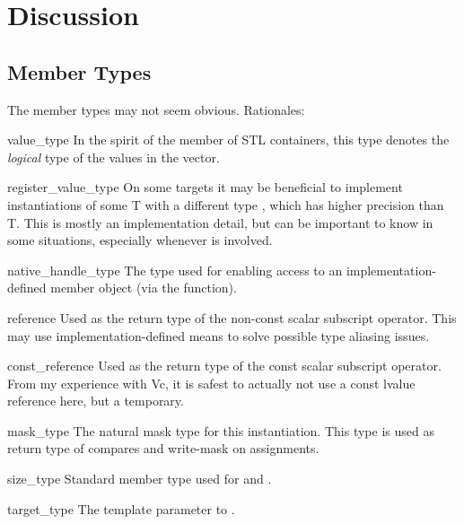\section{Discussion}

\subsection{Member Types}
The member types may not seem obvious.
Rationales:
\begin{typelist*}
  \item[value_type]
    In the spirit of the  member of STL containers, this type denotes the \emph{logical} type of the values in the vector.

  \item[register_value_type]
    On some targets it may be beneficial to implement \datapar instantiations of some \type T with a different type , which has higher precision than \type T.
    This is mostly an implementation detail, but can be important to know in some situations, especially whenever  is involved.


  \item[native_handle_type]
    The type used for enabling access to an implementation-defined member object (via the  function).

  \item[reference]
    Used as the return type of the non-const scalar subscript operator.
    This may use implementation-defined means to solve possible type aliasing issues.

  \item[const_reference]
    Used as the return type of the const scalar subscript operator.
    From my experience with Vc, it is safest to actually not use a const lvalue reference here, but a temporary.

  \item[mask_type]
    The natural mask type for this \datapar instantiation.
    This type is used as return type of compares and write-mask on assignments.

  \item[size_type]
    Standard member type used for  and .

  \item[target_type]
    The  template parameter to \datapar.

\end{typelist*}

